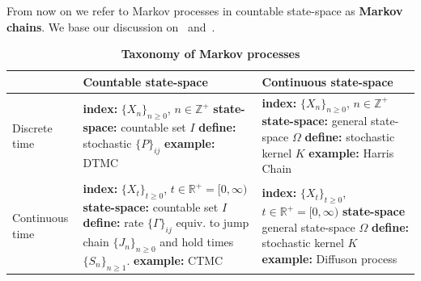 From now on we refer to Markov processes in countable state-space as \textbf{Markov chains}. We base our discussion on~\cite{rogers1994diffusions} and~\cite{norris1998markov}. 
\begin{table}[h]
	\begin{center}
		\caption[Taxonomy of Markov processes]{\textbf{Taxonomy of Markov processes}}
		\label{tab:MP-taxonomy}
		\begin{tabular}{p{2cm}|p{6cm}|p{6cm}}
			 & Countable state-space & Continuous state-space\\
			\midrule
			Discrete time 
			&\parbox{5cm}{\textbf{index: }$\{X_n\}_{n \geq 0}$, $n \in \mathbb{Z}^{+}$ \\ \textbf{state-space: } countable set $I$ \\ \textbf{define: } stochastic $\{P\}_{ij}$ \\ \textbf{example:} DTMC}  
			&\parbox{5cm}{\textbf{index: }$\{X_n\}_{n \geq 0}$, $n \in \mathbb{Z}^{+}$ \\ \textbf{state-space: } general state-space $\Omega$ \\ \textbf{define: } stochastic kernel $K$ \\ \textbf{example:} Harris Chain}\\
			\midrule
			Continuous time 
			&\parbox{5cm}{\textbf{index: }$\{X_t\}_{t \geq 0}$, $t \in \mathbb{R}^{+}=[0, \infty)$ \\ \textbf{state-space: } countable set $I$ \\ \textbf{define: } rate $\{\Gamma\}_{ij}$ equiv. to jump chain $\{J_n\}_{n\geq0}$ and hold times $\{S_n\}_{n\geq1}$. \\ \textbf{example:} CTMC}
			&\parbox{5cm}{\textbf{index: }$\{X_t\}_{t \geq 0}$, $t \in \mathbb{R}^{+}=[0, \infty)$ \\ \textbf{state-space} general state-space $\Omega$ \\ \textbf{define: } stochastic kernel $K$ \\ \textbf{example:} Diffuson process}\\
			\bottomrule %
		\end{tabular}
	\end{center}
\end{table}
